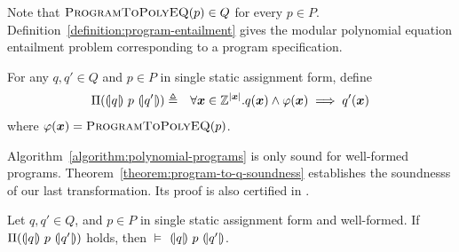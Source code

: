 Note that $\textsc{ProgramToPolyEQ}(p) \in Q$ for every $p \in P$.
Definition~\ref{definition:program-entailment} gives the modular
polynomial equation entailment problem corresponding to a program
specification.
\begin{definition}
  For any $q, q' \in Q$ and $p \in P$ in single static assignment
  form, define
  \begin{eqnarray*}
    \Pi(\hoaretriple{q}{p}{q'}) & \defn &
    \forall \vx \in \bbfZ^{|\vx|}. q(\vx) \wedge \varphi(\vx) \implies q'(\vx)
  \end{eqnarray*}
  where $\varphi(\vx) =
  \textsc{ProgramToPolyEQ}(p)$. 
  \label{definition:program-entailment}
\end{definition}

Algorithm~\ref{algorithm:polynomial-programs} is only sound for
well-formed programs. 
Theorem~\ref{theorem:program-to-q-soundness} establishes the
soundnesss of our last transformation. Its proof is also certified in
\coq. 
\begin{theorem}
  \label{theorem:program-to-q-soundness}
  Let $q, q' \in Q$, and $p \in P$ in single static assignment form
  and well-formed. 
  If $\Pi({(\!|}{q}{|\!)}~{p}~{(\!|}{q'}{|\!)})$ holds, then
  $\models$ ${(\!|}{q}{|\!)}~{p}~{(\!|}{q'}{|\!)}$.
\end{theorem}

